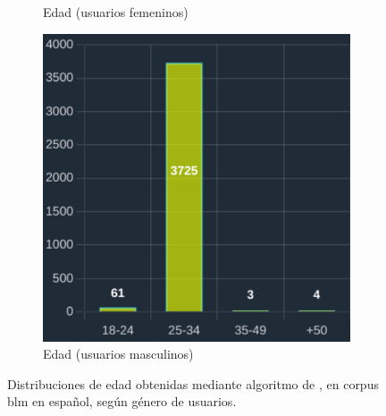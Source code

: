 \begin{figure}[H]
\begin{subfigure}{0.3\textwidth}
  \caption{Edad (usuarios femeninos)} 
  \end{subfigure}
  \begin{subfigure}{0.3\textwidth}
   \includegraphics[width=\textwidth]{imaxes/capturas-app/graficos/grivas/grafico-edad-grivas-masculino.png}
  \caption{Edad (usuarios masculinos)} 
  \end{subfigure}
  \caption{Distribuciones de edad obtenidas mediante algoritmo de \citet{grivas2015author}, en corpus \acrshort{blm} en español, según género de usuarios.}
  \label{fig:blm/resultados-edad-grivas}
\end{figure}


